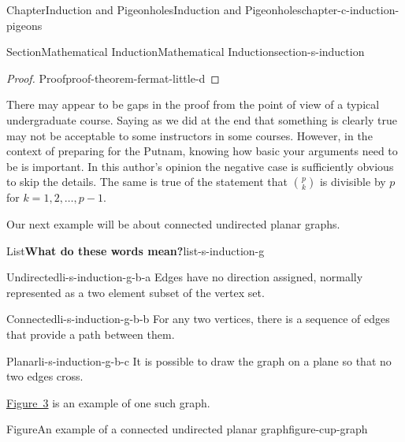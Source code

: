 \documentclass[oneside,10pt,]{book}
\numberwithin{equation}{section}
\begin{document}
\begin{chapterptx}{Chapter}{Induction and Pigeonholes}{}{Induction and Pigeonholes}{}{}{chapter-c-induction-pigeons}
\begin{sectionptx}{Section}{Mathematical Induction}{}{Mathematical Induction}{}{}{section-s-induction}
\begin{proof}{Proof}{}{proof-theorem-fermat-little-d}
\end{proof}
There may appear to be gaps in the proof from the point of view of a typical undergraduate course. Saying as we did at the end that something is clearly true may not be acceptable to some instructors in some courses.  However, in the context of preparing for the Putnam, knowing how basic your arguments need to be is important.  In this author's opinion the negative case is sufficiently obvious to skip the details. The same is true of the statement that \(\binom{p}{k}\) is divisible by \(p\) for \(k = 1, 2,\dots,p-1\).%
\par
Our next example will be about connected undirected planar graphs.%
\begin{listptx}{List}{\textbf{What do these words mean?}}{list-s-induction-g}{}%
%
\begin{descriptionlist}
\begin{dlimedium}{Undirected}{li-s-induction-g-b-a}%
Edges have no direction assigned, normally represented as a two element subset of the vertex set.%
\end{dlimedium}%
\begin{dlimedium}{Connected}{li-s-induction-g-b-b}%
For any two vertices, there is a sequence of edges that provide a path between them.%
\end{dlimedium}%
\begin{dlimedium}{Planar}{li-s-induction-g-b-c}%
It is possible to draw the graph on a plane so that no two edges cross.%
\end{dlimedium}%
\end{descriptionlist}
\end{listptx}%
\hyperref[figure-cup-graph]{Figure~3} is an example of one such graph.%
\begin{figureptx}{Figure}{An example of a connected undirected planar graph}{figure-cup-graph}{}%
\begin{image}{0}{1}{0}{}%

\end{image}
\end{figureptx}
\end{sectionptx}
\end{chapterptx}
\end{document}
